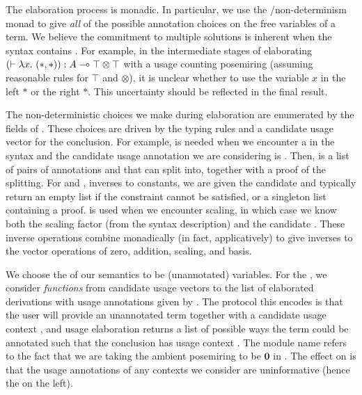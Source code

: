 
The elaboration process is monadic.
In particular, we use the /non-determinism monad to give
\emph{all} of the possible annotation choices on the free variables of a term.
We believe the commitment to multiple solutions is inherent when the syntax
contains .
For example, in the intermediate stages of elaborating
$\plr{\vdash \lambda x.~\plr{*,*}} : A \multimap \top \otimes \top$ with a
usage counting posemiring (assuming reasonable rules for $\top$ and $\otimes$),
it is unclear whether to use the variable $x$ in the left $*$ or the right $*$.
This uncertainty should be reflected in the final result.

The non-deterministic choices we make during elaboration are enumerated by
the fields of .
These choices are driven by the typing rules and a candidate usage vector for
the conclusion.
For example, \AgdaSpace{} is needed when we
encounter a  in the syntax and the candidate
usage annotation we are considering is .
Then, \AgdaSpace{} is a list of pairs of
annotations  and  that  can split into,
together with a proof of the splitting.
For  and , inverses to constants,
we are given the candidate  and typically return an empty list if
the constraint cannot be satisfied, or a singleton list containing a proof.
 is used when we encounter scaling, in which case we know
both the scaling factor  (from the syntax description) and the
candidate .
These inverse operations combine monadically (in fact, applicatively) to give
inverses to the vector operations of zero, addition, scaling, and basis.


We choose the \AgdaBound{$\V$} of our semantics to be (unannotated) variables.
For the \AgdaBound{$\C$}, we consider \emph{functions} from candidate usage
vectors  to the list of elaborated derivations with usage
annotations given by .
The protocol this encodes is that the user will provide an unannotated term
together with a candidate usage context , and usage elaboration
returns a list of possible ways the term could be annotated such that the
conclusion has usage context .
The module name  refers to the fact that we are taking the
ambient posemiring to be $\mathbf0$ in .
The effect on  is that the usage annotations of any
contexts we consider are uninformative (hence the \AgdaSymbol{\_} on the left).

